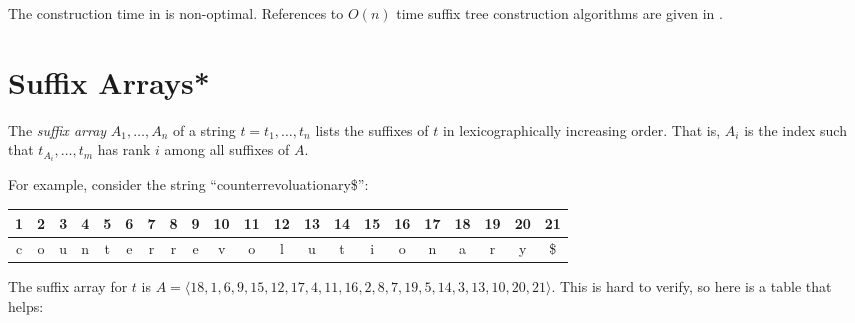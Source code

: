 The construction time in  is non-optimal.
References to $O(n)$ time suffix tree construction algorithms are given
in .


\section{Suffix Arrays*}

The \emph{suffix array} $A_1,\ldots,A_n$ of a string $t=t_1,\ldots,t_n$ lists
the suffixes of $t$ in lexicographically increasing order.  That is,
$A_i$ is the index such that $t_{A_{i}},\ldots,t_m$ has rank $i$ among
all suffixes of $A$.  

For example, consider the string ``counterrevoluationary\$'':
\begin{center}
  \begin{tabular}{|c|c|c|c|c|c|c|c|c|c|c|c|c|c|c|c|c|c|c|c|c|}\hline
     1&2&3&4&5&6&7&8&9&10&11&12&13&14&15&16&17&18&19&20&21\\\hline
     c&o&u&n&t&e&r&r&e&v&o&l&u&t&i&o&n&a&r&y&\$\\\hline
  \end{tabular}
\end{center}
The suffix array for $t$ is
$A=\langle18,1,6,9,15,12,17,4,11,16,2,8,7,19,5,14,3,13,10,20,21\rangle$.  This is hard to verify, so here is a table that helps:

